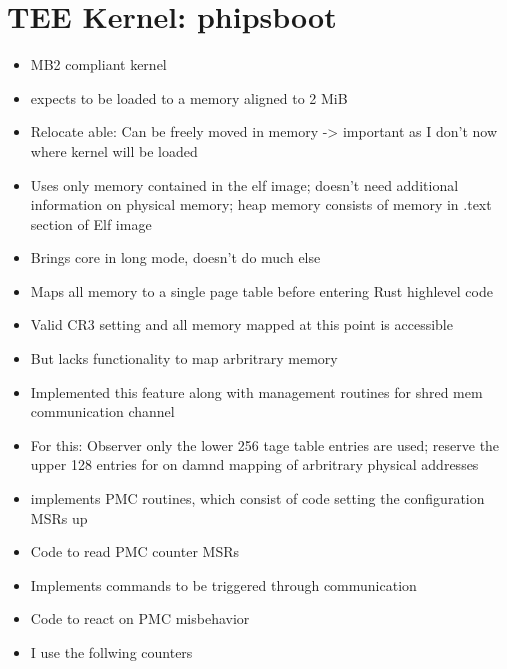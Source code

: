 \section{TEE Kernel: phipsboot}
\begin{itemize}
    \item MB2 compliant kernel
    \item expects to be loaded to a memory aligned to 2 MiB
    \item Relocate able: Can be freely moved in memory -> important as I don't
          now where kernel will be loaded
    \item Uses only memory contained in the elf image; doesn't need additional
          information on physical memory; heap memory consists of memory in
          .text section of Elf image
    \item Brings core in long mode, doesn't do much else
    \item Maps all memory to a single page table before entering Rust highlevel code
    \item Valid CR3 setting and all memory mapped at this point is accessible
    \item But lacks functionality to map arbritrary memory
    \item Implemented this feature along with management routines for shred mem
          communication channel
    \item For this: Observer only the lower 256 tage table entries are used;
          reserve the upper 128 entries for on damnd mapping of arbritrary physical addresses
    \item implements PMC routines, which consist of code setting the configuration MSRs up
    \item Code to read PMC counter MSRs
    \item Implements commands to be triggered through communication
    \item Code to react on PMC misbehavior
    \item I use the follwing counters
\end{itemize}

